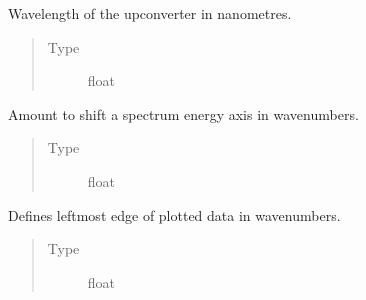 \documentclass[a4paper,10pt,english]{sphinxmanual}
\begin{document}
\begin{fulllineitems}
\begin{fulllineitems}
\begin{quote}
\begin{description}
\end{description}\end{quote}

\end{fulllineitems}


\begin{fulllineitems}
\label{\detokenize{sfgtools:sfgtools.SFGProcessTools.upconversion_line_num}}
\sphinxAtStartPar
Wavelength of the upconverter in nanometres.
\begin{quote}\begin{description}
\item[{Type}] \leavevmode
\sphinxAtStartPar
float

\end{description}\end{quote}

\end{fulllineitems}


\begin{fulllineitems}
\label{\detokenize{sfgtools:sfgtools.SFGProcessTools.calibration_offset}}
\sphinxAtStartPar
Amount to shift a spectrum energy axis in wavenumbers.
\begin{quote}\begin{description}
\item[{Type}] \leavevmode
\sphinxAtStartPar
float

\end{description}\end{quote}

\end{fulllineitems}


\begin{fulllineitems}
\label{\detokenize{sfgtools:sfgtools.SFGProcessTools.custom_region_start}}
\sphinxAtStartPar
Defines leftmost edge of plotted data in wavenumbers.
\begin{quote}\begin{description}
\item[{Type}] \leavevmode
\sphinxAtStartPar
float


\end{description}
\end{quote}
\end{fulllineitems}
\end{fulllineitems}
\end{document}
